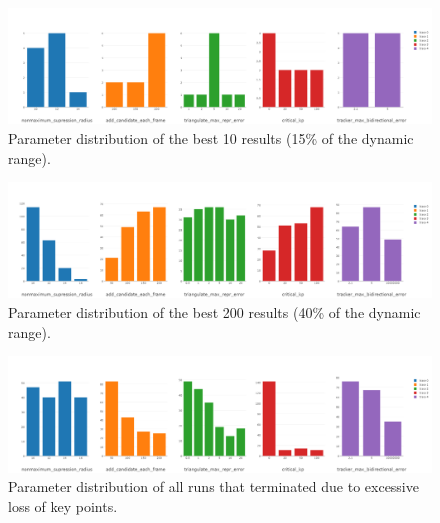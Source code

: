 \begin{figure}[htp]
	\centering
	\includegraphics[width=1\textwidth]{figures/best10}
	\caption{Parameter distribution of the best 10 results  (15\% of the dynamic range).}
	\label{fig:best10}
\end{figure}

\begin{figure}[htp]
	\centering
	\includegraphics[width=1\textwidth]{figures/best200}
	\caption{Parameter distribution of the best 200 results  (40\% of the dynamic range).}
	\label{fig:best200}
\end{figure}

\begin{figure}[htp]
	\centering
	\includegraphics[width=1\textwidth]{figures/exceptions}
	\caption{Parameter distribution of all runs that terminated due to excessive loss of key points. }
	\label{fig:exceptions}
\end{figure}